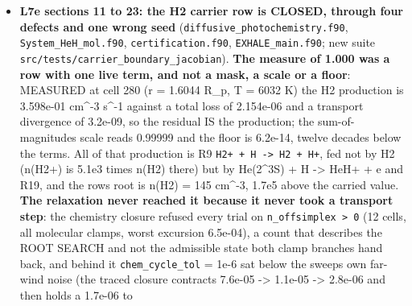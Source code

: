 \documentclass[english,a4paper]{my_memo}
\begin{document}
\begin{itemize}
  ratio 0.5000118; \texttt{report\_base\_face\_state} prints what the boundary did and
  the \texttt{EXHALE\_RESIDUAL} profile carries the stored Riemann face mass flux, so
  neither has to be reconstructed by hand again. \textbf{AND THE CAMPAIGN HAD TO BE
  RE-SOLVED}: the certified states are not states of the corrected boundary -\/-
  re-entered, the mass row of the certified atomic case reads 9.41e-01 against
  the 1.49e-09 it certifies at under the old one. On the fiducial, re-solved
  from its own certified state, CERTIFIED at outer pass 3: the base ghost goes
  413.7 K -\textgreater{} \textbf{226.0 K, which is \texttt{base.inp}\textquotesingle s \texttt{T\_base}}, cell 1 417.6 -\textgreater{}
  238.0 K at 1.73x the density, the profiles cross near cell 21 and agree to
  0.2 percent in the outer wind, and Mdot 7.5096e+07 -\textgreater{} 7.3767e+07 g/s
  (log10 7.8756 -\textgreater{} 7.8679, \textbf{-1.77 percent}) -\/- far above the 0.1 percent
  rule, so every case of the planet was due.
\item
  \textbf{L7e sections 11 to 23: the H2 carrier row is CLOSED, through four defects
  and one wrong seed} (\texttt{diffusive\_photochemistry.f90}, \texttt{System\_HeH\_mol.f90},
  \texttt{certification.f90}, \texttt{EXHALE\_main.f90}; new suite
  \texttt{src/tests/carrier\_boundary\_jacobian}). \textbf{The measure of 1.000 was a row with
  one live term, and not a mask, a scale or a floor}: MEASURED at cell 280
  (r = 1.6044 R\_p, T = 6032 K) the H2 production is 3.598e-01 cm\^{}-3 s\^{}-1
  against a total loss of 2.154e-06 and a transport divergence of 3.2e-09, so
  the residual IS the production; the sum-of-magnitudes scale reads 0.99999 and
  the floor is 6.2e-14, twelve decades below the terms. All of that production
  is R9 \texttt{H2+\ +\ H\ -\textgreater{}\ H2\ +\ H+}, fed not by H2 (n(H2+) is 5.1e3 times n(H2) there)
  but by He(2\^{}3S) + H -\textgreater{} HeH+ + e and R19, and the row\textquotesingle s root is
  n(H2) = 145 cm\^{}-3, 1.7e5 above the carried value. \textbf{The relaxation never
  reached it because it never took a transport step}: the chemistry closure
  refused every trial on \texttt{n\_offsimplex\ \textgreater{}\ 0} (12 cells, all molecular clamps,
  worst excursion 6.5e-04), a count that describes the ROOT SEARCH and not the
  admissible state both clamp branches hand back, and behind it
  \texttt{chem\_cycle\_tol} = 1e-6 sat below the sweep\textquotesingle s own far-wind noise (the traced
  closure contracts 7.6e-05 -\textgreater{} 1.1e-05 -\textgreater{} 2.8e-06 and then holds a 1.7e-06 to

\end{itemize}
\end{document}
